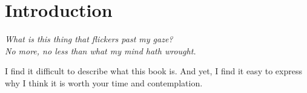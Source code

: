 

\part*{Introduction}


\begin{displayquote}
\textit{What is this thing that flickers past my gaze? \\
	No more, no less than what my mind hath wrought.}
\vspace{4mm}
\end{displayquote}

I find it difficult to describe what this book is. And yet, I find it easy to express why I think it is worth your time and contemplation.





